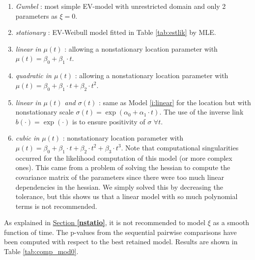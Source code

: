 \begin{enumerate}
	\item \emph{Gumbel} : most simple  EV-model with unrestricted domain and only 2 parameters as $\xi=0$.
	\item \emph{stationary} : EV-Weibull model fitted in Table \ref{tab:estlik} by MLE.
	\item\label{i:linear} \emph{linear in $\mu(t)$} : allowing a nonstationary location parameter with $\mu(t)=\beta_0+\beta_1\cdot t$.
	\item \emph{quadratic in $\mu(t)$} : allowing a nonstationary location parameter with $\mu(t)=\beta_0+\beta_1\cdot t+\beta_2\cdot t^2$.
	\item \emph{linear in $\mu(t)$ and $\sigma(t)$} : same as Model \ref{i:linear} for the location but with nonstationary scale $\sigma(t)=\exp(\alpha_0+\alpha_1\cdot t)$. The use of the inverse link $b(\cdot)=\exp(\cdot)$ is to ensure positivity of $\sigma$ $\forall t$.
	\item \emph{cubic in $\mu(t)$} : nonstationary location parameter with $\mu(t)=\beta_0+\beta_1\cdot t+\beta_2\cdot t^2+\beta_3\cdot t^3$. Note that computational singularities occurred for the likelihood computation of this model (or more complex ones). This came from a problem of solving the hessian to compute the covariance matrix of the parameters since there were too much linear dependencies in the hessian. We simply solved this by decreasing the tolerance, but this shows us that a linear model with so much polynomial terms is not recommended.
\end{enumerate}
As explained in \hyperref[nstatio]{Section \textbf{\ref{nstatio}}}, it is not recommended to model $\xi$ as a smooth function of time.
The p-values from the sequential pairwise comparisons have been computed with respect to the best retained model. Results are shown in Table \ref{tab:comp_mod0}.


